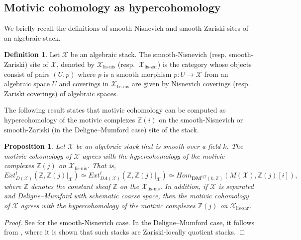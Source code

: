\documentclass[10pt]{amsart}
\theoremstyle{plain}
\newtheorem{proposition}[thm]{Proposition}
\theoremstyle{definition}
\newtheorem{definition}[thm]{Definition}
\newcommand{\sX}{{\mathcal X}}
\newcommand{\Z}{{\mathbb Z}}
\newcommand{\DM}[2]{\mathbf{DM}_{#2}^{\mathit{eff}}(#1)}
\begin{document}
\subsection{Motivic cohomology as hypercohomology}
We briefly recall the definitions of smooth-Nisnevich and
smooth-Zariski sites of an algebraic stack.
\begin{definition}
	Let $\sX$ be an algebraic stack. The smooth-Nisnevich (resp. smooth-Zariski) site of $\sX$, denoted by $\sX_{\text{lis-nis}}$ (resp.\ $\sX_{\text{lis-zar}}$) is the category whose objects consist of pairs $(U,p)$ where $p$ is a smooth morphism $p:U\rightarrow \sX$  from an algebraic space $U$ and coverings in $\sX_{\text{lis-nis}}$ are given by Nisnevich coverings (resp. Zariski coverings) of algebraic spaces.
\end{definition}

The following result states that motivic cohomology can be computed as
hypercohomology of the motivic complexes $\Z(i)$ on the
smooth-Nisnevich or smooth-Zariski (in the Deligne--Mumford case) site
of the stack.

\begin{proposition}\label{proposition-hypercohomology}
	Let $\sX$ be an algebraic stack that is smooth over a field $k$. The motivic cohomology of $\sX$ agrees with the hypercohomology of the motivic complexes $\Z(j)$ on $\sX_{\text{lis-nis}}$. That is,
	\[Ext^i_{D(\sX)}(\Z,\Z(j)|_\sX)\simeq
          Ext^i_{DA(\sX)}(\Z,\Z(j)|_\sX)\simeq
          Hom_{\DM{k,\Z}{}}(M(\sX),\Z(j)[i]),\] where $\Z$ denotes the
        constant sheaf $\Z$ on the $\sX_{\text{lis-nis}}$. In
        addition, if $\sX$ is separated and Deligne--Mumford with
        schematic coarse space, then the motivic cohomology of $\sX$
        agrees with the hypercohomology of the motivic complexes
        $\Z(j)$ on $\sX_{\text{lis-zar}}$.
\end{proposition}
\begin{proof}
  See \cite[Theorem 5.2]{cdh20} for the smooth-Nisnevich case. In the
  Deligne--Mumford case, it follows from \cite{KreschGeometry}, where it is shown that such stacks are Zariski-locally quotient stacks.
\end{proof}

\end{document}
